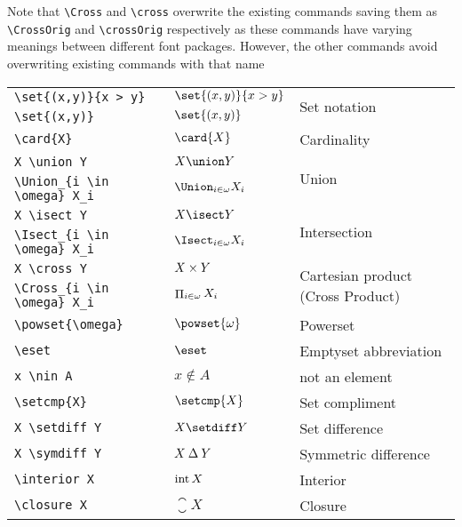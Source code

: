 \documentclass[leqno,11pt]{amsart}
\begin{document}
Note that \verb=\Cross= and \verb=\cross= overwrite the existing commands saving them as \verb=\CrossOrig= and \verb=\crossOrig= respectively as these commands have varying meanings between different font packages.  However, the other commands avoid overwriting existing commands with that name 

\begin{tabular}{l |  l | l}\toprule
	\verb=\set{(x,y)}{x > y}=	  &    \(   \set{(x,y)}{x > y} \)    & \multirow{2}{*}{Set notation}  \\[6pt]
	\verb=\set{(x,y)}=			  & 	\(   \set{(x,y)}      \)    &  \\ \midrule
	\verb=\card{X}=                          &    \(   \card{X}                   \)    & Cardinality \\ \midrule
	\verb=X \union Y=                        &    \(   X \union Y                 \)    & \multirow{2}{*}{Union}  \\[6pt]
	\verb=\Union_{i \in \omega} X_i=         &    \(   \Union_{i \in \omega} X_i  \)    &  \\ \midrule
	\verb=X \isect Y=                        &    \(   X \isect Y                 \)    & \multirow{2}{*}{Intersection} \\[6pt]
	\verb=\Isect_{i \in \omega} X_i=         &    \(   \Isect_{i \in \omega} X_i  \)    &  \\ \midrule
	\verb=X \cross Y=                        &    \(   X \mathbin{\times} Y                 \)    & \multirow{2}{*}{Cartesian product (Cross Product)} \\[6pt]
	\verb=\Cross_{i \in \omega} X_i=         &    \(   \mathop{\Pi}_{i \in \omega} X_i  \)    &  \\ \midrule
	\verb=\powset{\omega}=                   &    \(   \powset{\omega}            \)    &  Powerset \\ \midrule
	\verb=\eset=                             &    \(   \eset                      \)    &  Emptyset abbreviation\\ \midrule
	\verb=x \nin A=                          &    \(   x \nin A                   \)    &  not an element\\ \midrule
	\verb=\setcmp{X}=                        &    \(   \setcmp{X}                 \)    &  Set compliment\\\midrule
	\verb=X \setdiff Y=                     &    \(   X \setdiff Y              \)    & Set difference \\ \midrule
	\verb=X \symdiff Y=                      &    \(   X \mathbin{\Delta} Y               \)    & Symmetric difference \\ \midrule
	\verb=\interior X=                       &    \(   \operatorname{int} X                \)    & Interior \\ \midrule
	\verb=\closure X=                        &    \(   \closure X                 \)    & Closure \\ \midrule
		\bottomrule
	\end{tabular}          \\
\end{document}
